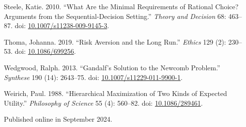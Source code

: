 \documentclass[
  10pt,
  letterpaper,
  DIV=11,
  numbers=noendperiod,
  twoside]{scrartcl}
\newlength{\cslhangindent}
\newenvironment{CSLReferences}[2] %
 {\begin{list}{}{%
  \setlength{\itemindent}{0pt}
  \setlength{\leftmargin}{0pt}
  \setlength{\parsep}{0pt}
  \ifodd #1
   \setlength{\leftmargin}{\cslhangindent}
   \setlength{\itemindent}{-1\cslhangindent}
  \fi
  \setlength{\itemsep}{#2\baselineskip}}}
 {\end{list}}
\begin{document}
\begin{CSLReferences}{1}{0}
Steele, Katie. 2010. {``What Are the Minimal Requirements of Rational
Choice? Arguments from the Sequential-Decision Setting.''} \emph{Theory
and Decision} 68: 463--87. doi:
\href{https://doi.org/10.1007/s11238-009-9145-3}{10.1007/s11238-009-9145-3}.

Thoma, Johanna. 2019. {``Risk Aversion and the Long Run.''}
\emph{Ethics} 129 (2): 230--53. doi:
\href{https://doi.org/10.1086/699256}{10.1086/699256}.

Wedgwood, Ralph. 2013. {``Gandalf's Solution to the Newcomb Problem.''}
\emph{Synthese} 190 (14): 2643--75. doi:
\href{https://doi.org/10.1007/s11229-011-9900-1}{10.1007/s11229-011-9900-1}.

Weirich, Paul. 1988. {``Hierarchical Maximization of Two Kinds of
Expected Utility.''} \emph{Philosophy of Science} 55 (4): 560--82. doi:
\href{https://doi.org/10.1086/289461}{10.1086/289461}.

\end{CSLReferences}



\noindent Published online in September 2024.
\end{document}
